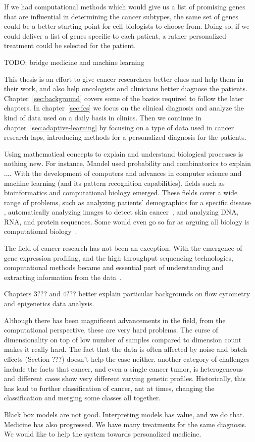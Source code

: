 If we had computational methods which would give us a list of promising genes that are influential in determining the cancer subtypes, the same set of genes could be a better starting point for cell biologists to choose from. Doing so, if we could deliver a list of genes specific to each patient, a rather personalized treatment could be selected for the patient.

TODO: bridge medicine and machine learning

This thesis is an effort to give cancer researchers better clues and help them in their work, and also help oncologists and clinicians better diagnose the patients. Chapter~\ref{sec:background} covers some of the basics required to follow the later chapters. In chapter~\ref{sec:fcs} we focus on the clinical diagnosis and analyze the kind of data used on a daily basis in clinics. Then we continue in chapter~\ref{sec:adaptive-learning} by focusing on a type of data used in cancer research laps, introducing methods for a personalized diagnosis for the patients.

Using mathematical concepts to explain and understand biological processes is nothing new. For instance, Mandel used probability and combinatorics to explain ...\cite{???}. With the development of computers and advances in computer science and machine learning (and its pattern recognition capabilities), fields such as bioinformatics and computational biology emerged. These fields cover a wide range of problems, such as analyzing patients' demographics for a specific disease \cite{...}, automatically analyzing images to detect skin cancer~\cite{...}, and analyzing DNA, RNA, and protein sequences. Some would even go so far as arguing all biology is computational biology~\cite{markowitz2017biology}.

The field of cancer research has not been an exception. With the emergence of gene expression profiling, and the high throughput sequencing technologies, computational methods became and essential part of understanding and extracting information from the data~\cite{...}.

Chapters 3??? and 4??? better explain particular backgrounds on flow cytometry and epigenetics data analysis.

Although there has been magnificent advancements in the field, from the computational perspective, these are very hard problems. The curse of dimensionality on top of low number of samples compared to dimension count makes it really hard. The fact that the data is often affected by noise and batch effects (Section ???) doesn't help the case neither. another category of challenges include the facts that cancer, and even a single cancer tumor, is heterogeneous and different cases show very different varying genetic profiles. Historically, this has lead to further classification of cancer, ant at times, changing the classification and merging some classes all together.

Black box models are not good. Interpreting models has value, and we do that. Medicine has also progressed. We have many treatments for the same diagnosis. We would like to help the system towards personalized medicine.
